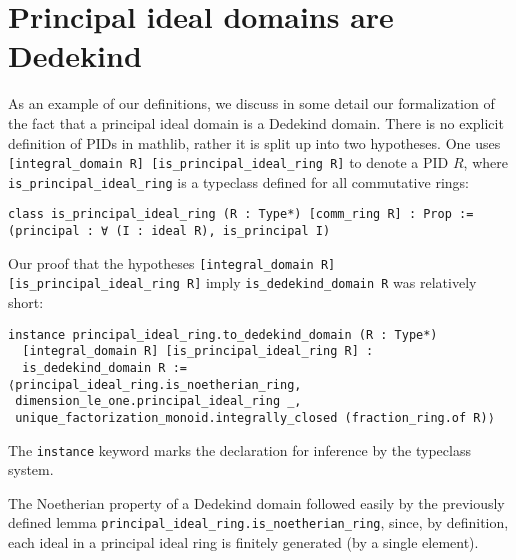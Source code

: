 \documentclass[a4paper,USenglish,cleveref, autoref, thm-restate]{lipics-v2021}
\newcommand{\lean}[1]{\texttt{#1}\xspace} %
\newcommand{\mathlib}{\textsf{mathlib}\xspace}
\begin{document}
\section{Principal ideal domains are Dedekind}

As an example of our definitions, we discuss in some detail our formalization of the fact that a principal ideal domain is a Dedekind domain. There is no explicit definition of PIDs in \mathlib, rather it is split up into two hypotheses.
One uses \lean{[integral\_domain R] [is\_principal\_ideal\_ring R]} to denote a PID $R$,
where \lean{is\_principal\_ideal\_ring} is a typeclass defined for all commutative rings:
\begin{lstlisting}
class is_principal_ideal_ring (R : Type*) [comm_ring R] : Prop :=
(principal : ∀ (I : ideal R), is_principal I)
\end{lstlisting}

Our proof that the hypotheses \lean{[integral\_domain R] [is\_principal\_ideal\_ring R]} imply \lean{is\_dedekind\_domain R} was relatively short:
\begin{lstlisting}
instance principal_ideal_ring.to_dedekind_domain (R : Type*)
  [integral_domain R] [is_principal_ideal_ring R] :
  is_dedekind_domain R :=
⟨principal_ideal_ring.is_noetherian_ring,
 dimension_le_one.principal_ideal_ring _,
 unique_factorization_monoid.integrally_closed (fraction_ring.of R)⟩
\end{lstlisting}
The \lean{instance} keyword marks the declaration for inference by the typeclass system.

The Noetherian property of a Dedekind domain followed easily by the previously defined lemma \lean{principal\_ideal\_ring.is\_noetherian\_ring}, since, by definition, each ideal in a principal ideal ring is finitely generated (by a single element).
\end{document}
